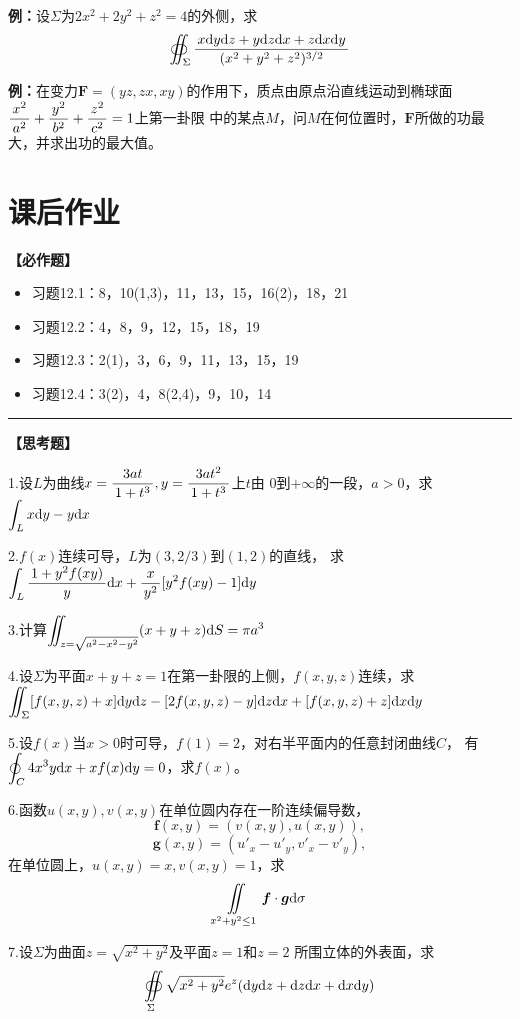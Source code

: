 {\bf 例：}设$\Sigma$为$2x^2+2y^2+z^2=4$的外侧，求
$$\oiint_{\Sigma}\displaystyle\frac{\,{x\mathrm{d} y\mathrm{d} z+y\mathrm{d} z\mathrm{d} x+z\mathrm{d} x\mathrm{d} y}\,}{\,{(x^2+y^2+z^2)^{3/2}}\,}$$

{\bf 例：}在变力$\bm{F}=(yz,zx,xy)$的作用下，质点由原点沿直线运动到椭球面
$\displaystyle\frac{\,{x^2}\,}{\,{a^2}\,}+\displaystyle\frac{\,{y^2}\,}{\,{b^2}\,}+\displaystyle\frac{\,{z^2}\,}{\,{c^2}\,}=1$上第一卦限
中的某点$M$，问$M$在何位置时，$\bm{F}$所做的功最大，并求出功的最大值。

\newpage

\section*{课后作业}

{\bf 【必作题】}

\begin{itemize}
  \setlength{\itemindent}{1cm}
  \item 习题12.1：8，10(1,3)，11，13，15，16(2)，18，21
  \item 习题12.2：4，8，9，12，15，18，19
  \item 习题12.3：2(1)，3，6，9，11，13，15，19
  \item 习题12.4：3(2)，4，8(2,4)，9，10，14
\end{itemize}

\bigskip

\hrule

\bigskip

{\bf 【思考题】}

1.\;设$L$为曲线$x=\displaystyle\frac{\,{3at}\,}{\,{1+t^3}\,},y=\displaystyle\frac{\,{3at^2}\,}{\,{1+t^3}\,}$上$t$由
$0$到$+\infty$的一段，$a>0$，求$\displaystyle\int_Lx\mathrm{d} y-y\mathrm{d} x$

2.\;$f(x)$连续可导，$L$为$(3,2/3)$到$(1,2)$的直线，
求$\displaystyle\int_L\displaystyle\frac{\,{1+y^2f(xy)}\,}{\,{y}\,}\mathrm{d} x+\displaystyle\frac{\,{x}\,}{\,{y^2}\,}[y^2f(xy)-1]\mathrm{d} y$

3.\;计算$\displaystyle\iint_{z=\sqrt{a^2-x^2-y^2}}(x+y+z)\mathrm{d} S=\pi a^3$

4.\;设$\Sigma$为平面$x+y+z=1$在第一卦限的上侧，$f(x,y,z)$连续，求
$\displaystyle\iint_{\Sigma}[f(x,y,z)+x]\mathrm{d} y\mathrm{d} z-[2f(x,y,z)-y]\mathrm{d} z\mathrm{d} x+
[f(x,y,z)+z]\mathrm{d} x\mathrm{d} y$

5.\;设$f(x)$当$x>0$时可导，$f(1)=2$，对右半平面内的任意封闭曲线$C$，
有$\displaystyle\oint_C4x^3y\mathrm{d} x+xf(x)\mathrm{d} y=0$，求$f(x)$。

6.\;函数$u(x,y),v(x,y)$在单位圆内存在一阶连续偏导数，
$$\bm{f}(x,y)=(v(x,y),u(x,y)),$$
$$\bm{g}(x,y)=\left(u'_x-u'_y,v'_x-v'_y\right),$$
在单位圆上，$u(x,y)=x,v(x,y)=1$，求
$$\iint\limits_{x^2+y^2\leq 1}\bm{f}\cdot\bm{g}\mathrm{d}\sigma$$

7.\;设$\Sigma$为曲面$z=\sqrt{x^2+y^2}$及平面$z=1$和$z=2$
所围立体的外表面，求
$$\oiint\limits_{\Sigma}\sqrt{x^2+y^2}e^z(\mathrm{d} y\mathrm{d} z+\mathrm{d} z\mathrm{d} x+\mathrm{d} x\mathrm{d} y)$$

